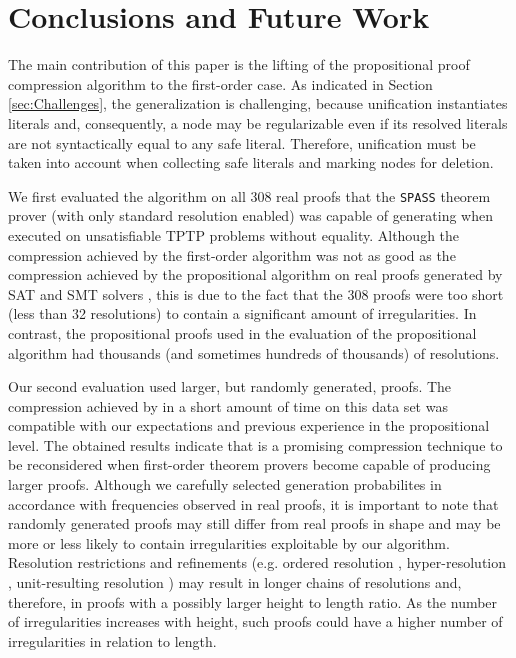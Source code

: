\section{Conclusions and Future Work}\label{sec:conclusion}

The main contribution of this paper is the lifting of the propositional proof compression algorithm {\RPI} to the first-order case. As indicated in Section \ref{sec:Challenges}, the generalization is challenging, because unification instantiates literals and, consequently, a node may be regularizable even if its resolved literals are not syntactically equal to any safe literal. Therefore, unification must be taken into account when collecting safe literals and marking nodes for deletion.

We first evaluated the algorithm on all 308 real proofs that the \texttt{SPASS} theorem prover (with only standard resolution enabled) was capable of generating when executed on unsatisfiable TPTP problems without equality. Although the compression achieved by the first-order {\FORPI} algorithm was not as good as the compression achieved by the propositional {\RPI} algorithm on real proofs generated by SAT and SMT solvers \cite{LURPI}, this is due to the fact that the 308 proofs were too short (less than 32 resolutions) to contain a significant amount of irregularities. In contrast, the propositional proofs used in the evaluation of the propositional {\RPI} algorithm had thousands (and sometimes hundreds of thousands) of resolutions. 

Our second evaluation used larger, but randomly generated, proofs. The compression achieved by {\FORPI} in a short amount of time on this data set was compatible with our expectations and previous experience in the propositional level. The obtained results indicate that {\FORPI} is a promising compression technique to be reconsidered when first-order theorem provers become capable of producing larger proofs. Although we carefully selected generation probabilites in accordance with frequencies observed in real proofs, it is important to note that randomly generated proofs may still differ from real proofs in shape and may be more or less likely to contain irregularities exploitable by our algorithm. Resolution restrictions and refinements (e.g. ordered resolution %
\cite{hsiang1991proving, OrderedRes}, hyper-resolution \cite{HyperResolution,robinson1965automatic}, unit-resulting resolution \cite{UnitResultingResolution,prover9-mace4}) may result in longer chains of resolutions and, therefore, in proofs with a possibly larger height to length ratio. As the number of irregularities increases with height, such proofs could have a higher number of irregularities in relation to length.


